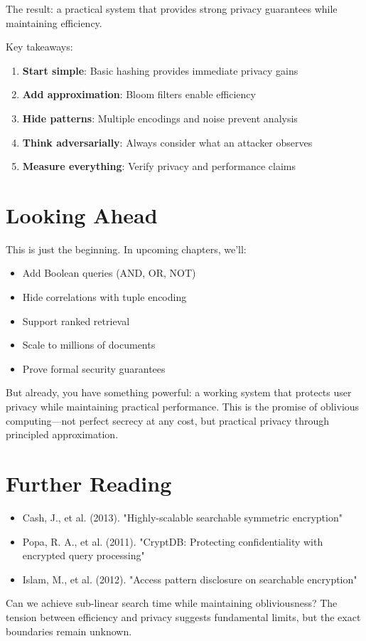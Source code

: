 The result: a practical system that provides strong privacy guarantees while maintaining efficiency.

Key takeaways:
\begin{enumerate}
    \item \textbf{Start simple}: Basic hashing provides immediate privacy gains
    \item \textbf{Add approximation}: Bloom filters enable efficiency
    \item \textbf{Hide patterns}: Multiple encodings and noise prevent analysis
    \item \textbf{Think adversarially}: Always consider what an attacker observes
    \item \textbf{Measure everything}: Verify privacy and performance claims
\end{enumerate}

\section{Looking Ahead}

This is just the beginning. In upcoming chapters, we'll:
\begin{itemize}
    \item Add Boolean queries (AND, OR, NOT)
    \item Hide correlations with tuple encoding
    \item Support ranked retrieval
    \item Scale to millions of documents
    \item Prove formal security guarantees
\end{itemize}

But already, you have something powerful: a working system that protects user privacy while maintaining practical performance. This is the promise of oblivious computing—not perfect secrecy at any cost, but practical privacy through principled approximation.

\section{Further Reading}

\begin{itemize}
    \item Cash, J., et al. (2013). "Highly-scalable searchable symmetric encryption"
    \item Popa, R. A., et al. (2011). "CryptDB: Protecting confidentiality with encrypted query processing"
    \item Islam, M., et al. (2012). "Access pattern disclosure on searchable encryption"
\end{itemize}

\begin{researchfrontier}
Can we achieve sub-linear search time while maintaining obliviousness? The tension between efficiency and privacy suggests fundamental limits, but the exact boundaries remain unknown.
\end{researchfrontier}